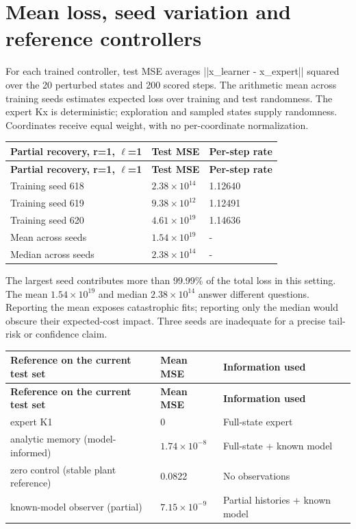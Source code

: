 \documentclass{l4dc2026}
\begin{document}
\section{Mean loss, seed variation and reference controllers}
For each trained controller, test MSE averages ||x\_learner - x\_expert|| squared over the 20 perturbed states and 200 scored steps. The arithmetic mean across training seeds estimates expected loss over training and test randomness. The expert Kx is deterministic; exploration and sampled states supply randomness. Coordinates receive equal weight, with no per-coordinate normalization.

{\small\setlength{\tabcolsep}{3pt}
\begin{longtable}{@{}p{}p{}p{}@{}}
\toprule
\textbf{Partial recovery, r=1, $\ell$=1} & \textbf{Test MSE} & \textbf{Per-step rate} \\
\midrule\endfirsthead
\toprule
\textbf{Partial recovery, r=1, $\ell$=1} & \textbf{Test MSE} & \textbf{Per-step rate} \\
\midrule\endhead
\bottomrule\endfoot
Training seed 618 & $2.38\times10^{14}$ & 1.12640 \\
Training seed 619 & $9.38\times10^{12}$ & 1.12491 \\
Training seed 620 & $4.61\times10^{19}$ & 1.14636 \\
Mean across seeds & $1.54\times10^{19}$ & - \\
Median across seeds & $2.38\times10^{14}$ & - \\
\end{longtable}}

The largest seed contributes more than 99.99\% of the total loss in this setting. The mean $1.54\times10^{19}$ and median $2.38\times10^{14}$ answer different questions. Reporting the mean exposes catastrophic fits; reporting only the median would obscure their expected-cost impact. Three seeds are inadequate for a precise tail-risk or confidence claim.

{\small\setlength{\tabcolsep}{3pt}
\begin{longtable}{@{}p{}p{}p{}@{}}
\toprule
\textbf{Reference on the current test set} & \textbf{Mean MSE} & \textbf{Information used} \\
\midrule\endfirsthead
\toprule
\textbf{Reference on the current test set} & \textbf{Mean MSE} & \textbf{Information used} \\
\midrule\endhead
\bottomrule\endfoot
expert K1 & 0 & Full-state expert \\
analytic memory (model-informed) & $1.74\times10^{-8}$ & Full-state + known model \\
zero control (stable plant reference) & 0.0822 & No observations \\
known-model observer (partial) & $7.15\times10^{-9}$ & Partial histories + known model \\
\end{longtable}}
\end{document}
